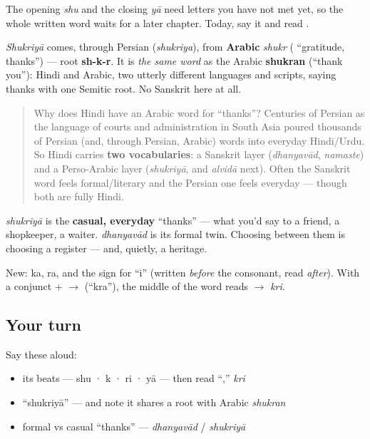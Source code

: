 The opening \emph{shu} and the closing \emph{yā} need letters you have not met yet, so the whole written word waits for a later chapter. Today, say it and read \textbf{}.

\begin{cousinweb}
\emph{Shukriyā} comes, through Persian (\emph{shukriya}), from \textbf{Arabic} \emph{shukr} ( \textquotedblleft{}gratitude, thanks\textquotedblright{}) — root \textbf{sh-k-r}. It is \emph{the same word} as the Arabic \textbf{shukran} (\textquotedblleft{}thank you\textquotedblright{}): Hindi and Arabic, two utterly different languages and scripts, saying thanks with one Semitic root. No Sanskrit here at all.

\begin{quote}
Why does Hindi have an Arabic word for \textquotedblleft{}thanks\textquotedblright{}? Centuries of Persian as the language of courts and administration in South Asia poured thousands of Persian (and, through Persian, Arabic) words into everyday Hindi/Urdu. So Hindi carries \textbf{two vocabularies}: a Sanskrit layer (\emph{dhanyavād}, \emph{namaste}) and a Perso-Arabic layer (\emph{shukriyā}, and \emph{alvidā} next). Often the Sanskrit word feels formal/literary and the Persian one feels everyday — though both are fully Hindi.
\end{quote}
\end{cousinweb}

\begin{culture}
\emph{shukriyā} is the \textbf{casual, everyday} \textquotedblleft{}thanks\textquotedblright{} — what you'd say to a friend, a shopkeeper, a waiter. \emph{dhanyavād} is its formal twin. Choosing between them is choosing a register — and, quietly, a heritage.
\end{culture}

\begin{sounds}
New:  ka,  ra, and the sign  for “i” (written \emph{before} the consonant, read \emph{after}). With a conjunct  +  $\to$  (“kra”), the middle of the word reads  $\to$ \emph{kri}.
\end{sounds}

\subsection*{Your turn}
Say these aloud:

\begin{itemize}
\raggedright
  \item its beats — shu · k · ri · yā — then read \textquotedblleft{},\textquotedblright{} \emph{kri}
  \item \textquotedblleft{}shukriyā\textquotedblright{} — and note it shares a root with Arabic \emph{shukran}
  \item formal vs casual \textquotedblleft{}thanks\textquotedblright{} — \emph{dhanyavād} / \emph{shukriyā}
\end{itemize}

